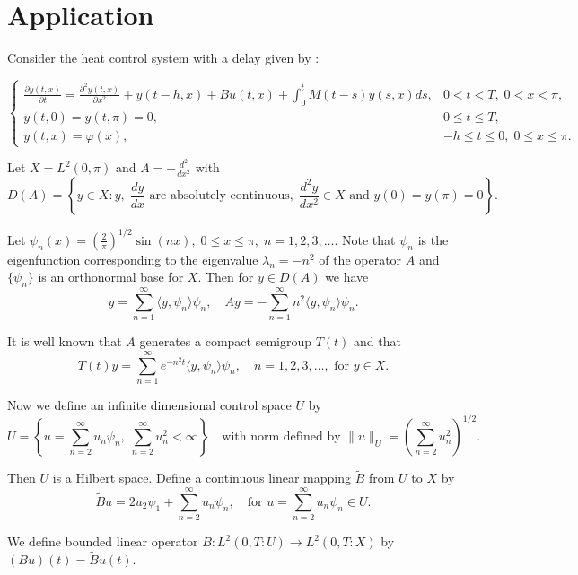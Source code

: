 \documentclass[12pt]{article}
\theoremstyle{plain}
\theoremstyle{definition}
\begin{document}
\section{Application}
 Consider the heat control system with a delay given by \cite{sukavanam2011approximate} :

 \begin{equation}
\begin{cases}
\frac{\partial y(t,x)}{\partial t} = \frac{\partial^2 y(t,x)}{\partial x^2} + y(t - h,x) + Bu(t,x) + \int_0^t M(t-s)y(s,x) ds, & 0 < t < T, \; 0 < x < \pi, \\
y(t,0) = y(t,\pi) = 0, & 0 \le t \le T, \\
y(t,x) = \varphi(x), & -h \le t \le 0, \; 0 \le x \le \pi.
\end{cases}
\end{equation}


Let $X = L^2(0, \pi)$ and $A = -\frac{d^2}{dx^2}$ with 
\[
D(A) = \left\{ y \in X : y, \; \frac{dy}{dx} \text{ are absolutely continuous}, \; \frac{d^2 y}{dx^2} \in X \text{ and } y(0) = y(\pi) = 0 \right\}.
\]

Let $\psi_n(x) = \left( \frac{2}{\pi} \right)^{1/2} \sin(nx), \; 0 \le x \le \pi, \; n = 1, 2, 3, \dots$. Note that $\psi_n$ is the eigenfunction corresponding to the eigenvalue $\lambda_n = -n^2$ of the operator $A$ and $\{ \psi_n \}$ is an orthonormal base for $X$. Then for $y \in D(A)$ we have \cite{jha2024exact,jha2024existence} 
\[
y = \sum_{n=1}^\infty \langle y, \psi_n \rangle \psi_n, \quad Ay = -\sum_{n=1}^\infty n^2 \langle y, \psi_n \rangle \psi_n.
\]

It is well known that $A$ generates a compact semigroup $T(t)$ \cite{naito1987controllability,jeong1999approximate,jha2025approximate} and that
\[
T(t)y = \sum_{n=1}^\infty e^{-n^2 t} \langle y, \psi_n \rangle \psi_n, \quad n = 1, 2, 3, \dots, \text{ for } y \in X.
\]

Now we define an infinite dimensional control space $U$ by
\[
U = \left\{ u = \sum_{n=2}^\infty u_n \psi_n, \; \sum_{n=2}^\infty u_n^2 < \infty \right\} \quad \text{with norm defined by } \| u \|_U = \left( \sum_{n=2}^\infty u_n^2 \right)^{1/2}.
\]

Then $U$ is a Hilbert space. Define a continuous linear mapping $\tilde{B}$ from $U$ to $X$ by
\[
\tilde{B}u = 2u_2 \psi_1 + \sum_{n=2}^\infty u_n \psi_n, \quad \text{for } u = \sum_{n=2}^\infty u_n \psi_n \in U.
\]

We define bounded linear operator $B : L^2(0,T:U) \to L^2(0,T:X)$ by $(Bu)(t) = \tilde{B}u(t)$.
\end{document}
